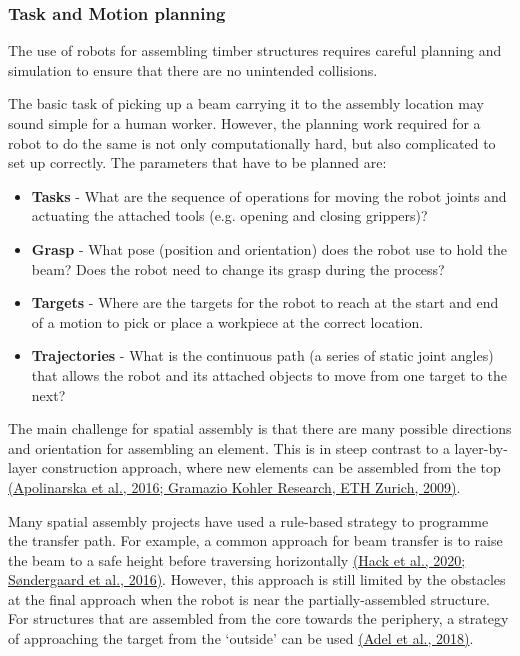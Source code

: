 \documentclass[11pt]{book}
\begin{document}
\subsubsection{Task and Motion planning}

The use of robots for assembling timber structures requires careful planning and simulation to ensure that there are no unintended collisions. 

The basic task of picking up a beam carrying it to the assembly location may sound simple for a human worker. However, the planning work required for a robot to do the same is not only computationally hard, but also complicated to set up correctly. The parameters that have to be planned are:

\begin{itemize}
	\item \textbf{Tasks} - What are the sequence of operations for moving the robot joints and actuating the attached tools (e.g. opening and closing grippers)?

	\item \textbf{Grasp }- What pose (position and orientation) does the robot use to hold the beam? Does the robot need to change its grasp during the process?

	\item \textbf{Targets }- Where are the targets for the robot to reach at the start and end of a motion to pick or place a workpiece at the correct location.

	\item \textbf{Trajectories }- What is the continuous path (a series of static joint angles) that allows the robot and its attached objects to move from one target to the next?

\end{itemize}
The main challenge for spatial assembly is that there are many possible directions and orientation for assembling an element. This is in steep contrast to a layer-by-layer construction approach, where new elements can be assembled from the top \href{https://www.zotero.org/google-docs/?vZK1dq}{(Apolinarska et al., 2016; Gramazio Kohler Research, ETH Zurich, 2009)}. 

Many spatial assembly projects have used a rule-based strategy to programme the transfer path. For example, a common approach for beam transfer is to raise the beam to a safe height before traversing horizontally \href{https://www.zotero.org/google-docs/?SFqNJ2}{(Hack et al., 2020; Søndergaard et al., 2016)}. However, this approach is still limited by the obstacles at the final approach when the robot is near the partially-assembled structure. For structures that are assembled from the core towards the periphery, a strategy of approaching the target from the ‘outside’ can be used \href{https://www.zotero.org/google-docs/?aftLlm}{(Adel et al., 2018)}. 
\end{document}
